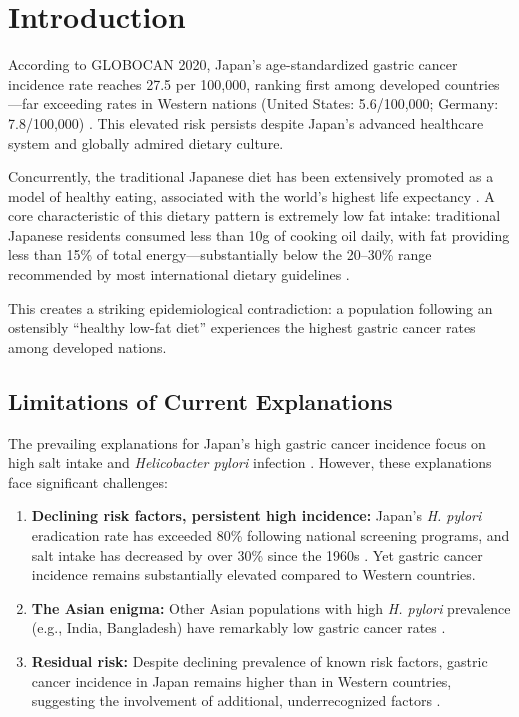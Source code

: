 \documentclass[review]{elsarticle}
\begin{document}
\linenumbers

\section{Introduction}

According to GLOBOCAN 2020, Japan's age-standardized gastric cancer incidence rate reaches 27.5 per 100,000, ranking first among developed countries---far exceeding rates in Western nations (United States: 5.6/100,000; Germany: 7.8/100,000) \cite{sung2021}. This elevated risk persists despite Japan's advanced healthcare system and globally admired dietary culture.

Concurrently, the traditional Japanese diet has been extensively promoted as a model of healthy eating, associated with the world's highest life expectancy \cite{willcox2009}. A core characteristic of this dietary pattern is extremely low fat intake: traditional Japanese residents consumed less than 10g of cooking oil daily, with fat providing less than 15\% of total energy---substantially below the 20--30\% range recommended by most international dietary guidelines \cite{mhlw2020,chinese2022}.

This creates a striking epidemiological contradiction: a population following an ostensibly ``healthy low-fat diet'' experiences the highest gastric cancer rates among developed nations.

\subsection{Limitations of Current Explanations}

The prevailing explanations for Japan's high gastric cancer incidence focus on high salt intake \cite{delia2012} and \textit{Helicobacter pylori} infection \cite{uemura2001}. However, these explanations face significant challenges:

\begin{enumerate}
    \item \textbf{Declining risk factors, persistent high incidence:} Japan's \textit{H. pylori} eradication rate has exceeded 80\% following national screening programs, and salt intake has decreased by over 30\% since the 1960s \cite{kamada2015,powles2013}. Yet gastric cancer incidence remains substantially elevated compared to Western countries.
    
    \item \textbf{The Asian enigma:} Other Asian populations with high \textit{H. pylori} prevalence (e.g., India, Bangladesh) have remarkably low gastric cancer rates \cite{holcombe1992}.
    
    \item \textbf{Residual risk:} Despite declining prevalence of known risk factors, gastric cancer incidence in Japan remains higher than in Western countries, suggesting the involvement of additional, underrecognized factors \cite{inoue2005}.
\end{enumerate}
\end{document}
